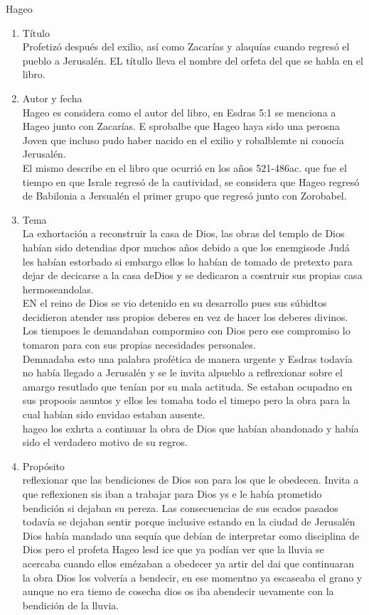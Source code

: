 \documentclass[12pt]{article}
\begin{document}
\begin{section}{Hageo}
	\begin{enumerate}
		\item Título\\
			Profetizó después del exilio, así como Zacarías y alaquías cuando regresó el pueblo a Jerusalén. EL títullo lleva el nombre del orfeta del que se habla en el libro. 
		\item Autor y fecha\\
			Hageo es considera como el autor del libro, en Esdras 5:1 se menciona a Hageo junto con Zacarías. E sprobalbe que Hageo haya sido una perosna Joven que incluso pudo haber nacido en el exilio y robalblemte ni conocía Jerusalén.\\
			El mismo describe en el libro que ocurrió en los años 521-486ac. que fue el tiempo en que Israle regresó de la cautividad, se considera que Hageo regresó de Babilonia a Jersualén el primer grupo que regresó junto con Zorobabel.
		\item Tema\\
			La exhortación a reconstruir la casa de Dios, las obras del templo de Dios habían sido detendias dpor muchos años debido a que los enemgisode Judá les habían estorbado si embargo ellos lo habían de tomado de pretexto para dejar de decicarse a la casa deDios y se dedicaron a cosntruir sus propias casa hermoseandolas.\\
			EN el reino de Dios se vio detenido en su desarrollo pues sus súbidtos decidieron atender uss propios deberes en vez de hacer los deberes divinos. Los tiempoes le demandaban compormiso con Dios pero ese compromiso lo tomaron para con sus propias necesidades personales.\\
			Demnadaba esto una palabra profética de manera urgente y Esdras todavía no había llegado a Jerusalén y se le invita alpueblo a reflrexionar sobre el amargo resutlado que tenían por su mala actituda. Se estaban ocupadno en sus propoois asuntos y ellos les tomaba todo el timepo pero la obra para la cual habían sido envidao estaban ausente.\\
			hageo los exhrta a continuar la obra de Dios que habían abandonado y había sido el verdadero motivo de su regros.
		\item Propósito\\
			reflexionar que las bendiciones de Dios son para los que le obedecen. Invita a que reflexionen sis iban a trabajar para Dios ys e le había prometido bendición si dejaban su pereza. Las consecuencias de sus ecados pasados todavía se dejaban sentir porque inclusive estando en la ciudad de Jerusalén Dios había mandado una sequía que debían de interpretar como disciplina de Dios pero el profeta Hageo lesd ice que ya podían ver que la lluvia se acercaba cuando ellos emézaban a obedecer ya  artir del dai que continuaran la obra Dios los volvería a bendecir, en ese momentno ya escaseaba el grano y aunque no era tiemo de cosecha dios os iba  abendecir  uevamente con la bendición de la lluvia.

\end{enumerate}
\end{section}
\end{document}
